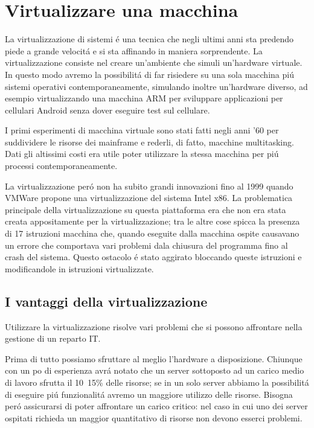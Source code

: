 \documentclass[a4paper,10pt]{book}
\begin{document}
\chapter{Virtualizzare una macchina}
La virtualizzazione di sistemi é una tecnica che negli ultimi anni sta predendo piede a grande velocitá e si sta affinando in maniera sorprendente. La virtualizzazione consiste nel creare un'ambiente che simuli un'hardware virtuale. In questo modo avremo la possibilitá di far risiedere su una sola macchina piú sistemi operativi contemporaneamente, simulando inoltre un'hardware diverso, ad esempio virtualizzando una macchina ARM per sviluppare applicazioni per cellulari Android senza dover eseguire test sul cellulare.

I primi esperimenti di macchina virtuale sono stati fatti negli anni '60 per suddividere le risorse dei mainframe e rederli, di fatto, macchine multitasking. Dati gli altissimi costi era utile poter utilizzare la stessa macchina per piú processi contemporaneamente.

La virtualizzazione peró non ha subito grandi innovazioni fino al 1999 quando VMWare propone una virtualizzazione del sistema Intel x86. La problematica principale della virtualizzazione su questa piattaforma era che non era stata creata appositamente per la virtualizzazione; tra le altre cose spicca la presenza di 17 istruzioni macchina che, quando eseguite dalla macchina ospite causavano un errore che comportava vari problemi dala chiusura del programma fino al crash del sistema. Questo ostacolo é stato aggirato bloccando queste istruzioni e modificandole in istruzioni virtualizzate.

\section{I vantaggi della virtualizzazione}
Utilizzare la virtualizzazione risolve vari problemi che si possono affrontare nella gestione di un reparto IT.

Prima di tutto possiamo sfruttare al meglio l'hardware a disposizione. Chiunque con un po di esperienza avrá notato che un server sottoposto ad un carico medio di lavoro sfrutta il 10~15\% delle risorse; se in un solo server abbiamo la possibilitá di eseguire piú funzionalitá avremo un maggiore utilizzo delle risorse. Bisogna peró assicurarsi di poter affrontare un carico critico: nel caso in cui uno dei server ospitati richieda un maggior quantitativo di risorse non devono esserci problemi.
\end{document}
